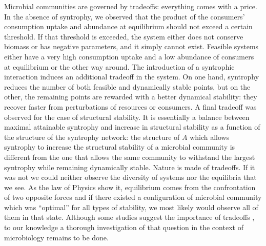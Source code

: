 \documentclass[12pt, titlepage]{report}
\begin{document}
Microbial communities are governed by tradeoffs: everything comes with a price.
In the absence of syntrophy, we observed that the product of the consumers' consumption uptake and abundance at equilibrium should not exceed a certain threshold. If that threshold is exceeded, the system either does not conserve biomass or has negative parameters, and it simply cannot exist. Feasible systems either have a very high consumption uptake and a low abundance of consumers at equilibrium or the other way around. The introduction of a syntrophic interaction induces an additional tradeoff in the system. On one hand, syntrophy reduces the number of both feasible and dynamically stable points, but on the other, the remaining points are rewarded with a better dynamical stability: they recover faster from perturbations of resources or consumers. A final tradeoff was observed for the case of structural stability. It is essentially a balance between maximal attainable syntrophy and increase in structural stability as a function of the structure of the syntrophy network: the structure of $A$ which allows syntrophy to increase the structural stability of a microbial community is different from the one that allows the same community to withstand the largest syntrophy while remaining dynamically stable. Nature is made of tradeoffs. If it was not we could neither observe the diversity of systems nor the equilibria that we see. As the law of Physics show it, equilibrium comes from the confrontation of two opposite forces and if there existed a configuration of microbial community which was ``optimal'' for all types of stability, we most likely would observe all of them in that state. Although some studies suggest the importance of tradeoffs \cite{pfeiffer_evolutionary_2002}, to our knowledge a thorough investigation of that question in the context of microbiology remains to be done.
\end{document}
